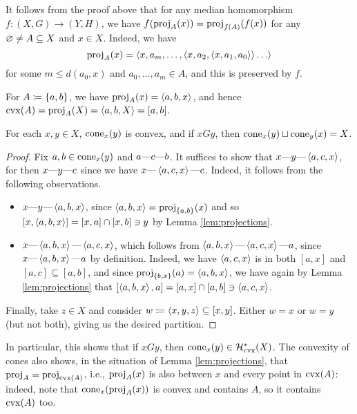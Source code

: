 \documentclass[reqno]{amsart}
\begin{document}
    \begin{remark}\label{rem:projections}
        It follows from the proof above that for any median homomorphism $f:(X,G)\to(Y,H)$, we have $f(\proj_A(x))=\proj_{f(A)}(f(x))$ for any $\em\neq A\subseteq X$ and $x\in X$. Indeed, we have
        \begin{equation*}
            \proj_A(x)=\l\langle x,a_m,\dots,\l\langle x,a_2,\l\langle x,a_1,a_0\r\rangle\r\rangle\dots\r\rangle
        \end{equation*}
        for some $m\leq d(a_0,x)$ and $a_0,\dots,a_m\in A$, and this is preserved by $f$.
    
        For $A\coloneqq\l\{a,b\r\}$, we have $\proj_A(x)=\l\langle a,b,x\r\rangle$, and hence $\cvx(A)=\proj_A(X)=\l\langle a,b,X\r\rangle=[a,b]$.
    \end{remark}

    \begin{lemma}\label{lem:cones_are_convex}
        For each $x,y\in X$, $\cone_x(y)$ is convex, and if $xGy$, then $\cone_x(y)\sqcup\cone_y(x)=X$.
    \end{lemma}
    \begin{proof}
        Fix $a,b\in\cone_x(y)$ and $a\-c\-b$. It suffices to show that $x\-y\-\l\langle a,c,x\r\rangle$, for then $x\-y\-c$ since we have $x\-\l\langle a,c,x\r\rangle\-c$. Indeed, it follows from the following observations.
        \begin{itemize}
            \item $x\-y\-\l\langle a,b,x\r\rangle$, since $\l\langle a,b,x\r\rangle=\proj_{\l\{a,b\r\}}(x)$ and so $[x,\l\langle a,b,x\r\rangle]=[x,a]\cap[x,b]\ni y$ by Lemma \ref{lem:projections}.
            \item $x\-\l\langle a,b,x\r\rangle\-\l\langle a,c,x\r\rangle$, which follows from $\l\langle a,b,x\r\rangle\-\l\langle a,c,x\r\rangle\-a$, since $x\-\l\langle a,b,x\r\rangle\-a$ by definition. Indeed, we have $\l\langle a,c,x\r\rangle$ is in both $[a,x]$ and $[a,c]\subseteq[a,b]$, and since $\proj_{\l\{b,x\r\}}(a)=\l\langle a,b,x\r\rangle$, we have again by Lemma \ref{lem:projections} that $[\l\langle a,b,x\r\rangle,a]=[a,x]\cap[a,b]\ni\l\langle a,c,x\r\rangle$.
        \end{itemize}
        Finally, take $z\in X$ and consider $w\coloneqq\l\langle x,y,z\r\rangle\subseteq[x,y]$. Either $w=x$ or $w=y$ (but not both), giving us the desired partition.
    \end{proof}

    \begin{remark}\label{rem:projection_between_point_in_convex}
        In particular, this shows that if $xGy$, then $\cone_x(y)\in\mc{H}^\ast_\mathrm{cvx}(X)$. The convexity of cones also shows, in the situation of Lemma \ref{lem:projections}, that $\proj_A=\proj_{\cvx(A)}$, i.e., $\proj_A(x)$ is also between $x$ and every point in $\cvx(A)$: indeed, note that $\cone_x(\proj_A(x))$ is convex and contains $A$, so it contains $\cvx(A)$ too.
    \end{remark}
\end{document}
